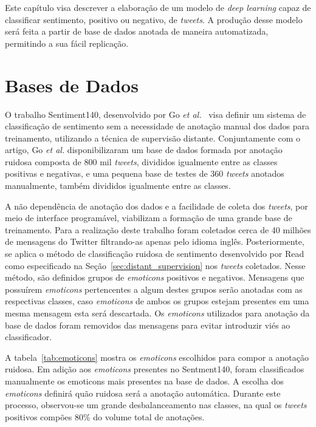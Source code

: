 Este capítulo visa descrever a elaboração de um modelo de \textit{deep learning} capaz de classificar sentimento,
positivo ou negativo, de \textit{tweets}.
A produção desse modelo será feita a partir de base de dados anotada de maneira automatizada, permitindo a sua
fácil replicação.

\section{Bases de Dados} \label{sec:data}

O trabalho Sentiment140, desenvolvido por Go \textit{et al.}~\cite{go09} visa definir um sistema de classificação de
sentimento sem a necessidade de anotação manual dos dados para treinamento, utilizando a técnica de supervisão distante.
Conjuntamente com o artigo, Go \textit{et al.} disponibilizaram um base de dados formada por anotação ruidosa composta
de 800 mil \textit{tweets}, divididos igualmente entre as classes positivas e negativas, e uma pequena base de testes de
360 \textit{tweets} anotados manualmente, também divididos igualmente entre as classes.

A não dependência de anotação dos dados e a facilidade de coleta dos \textit{tweets}, por meio de interface programável,
viabilizam a formação de uma grande base de treinamento.
Para a realização deste trabalho foram coletados cerca de 40 milhões de mensagens do Twitter filtrando-as apenas pelo
idioma inglês.
Posteriormente, se aplica o método de classificação ruidosa de sentimento desenvolvido por Read~\cite{read05} como
especificado na Seção~\ref{sec:distant_supervision} nos \textit{tweets} coletados.
Nesse método, são definidos grupos de \textit{emoticons} positivos e negativos.
Mensagens que possuírem \textit{emoticons} pertencentes a algum destes grupos serão anotadas com as respectivas classes,
caso \textit{emoticons} de ambos os grupos estejam presentes em uma mesma mensagem esta será descartada.
Os \textit{emoticons} utilizados para anotação da base de dados foram removidos das mensagens para evitar introduzir
viés ao classificador.

A tabela~\ref{tab:emoticons} mostra os \textit{emoticons} escolhidos para compor a anotação ruidosa.
Em adição aos \textit{emoticons} presentes no Sentment140, foram classificados manualmente os emoticons mais presentes
na base de dados.
A escolha dos \textit{emoticons} definirá quão ruidosa será a anotação automática.
Durante este processo, observou-se um grande desbalanceamento nas classes, na qual os \textit{tweets} positivos
compões 80\% do volume total de anotações.

